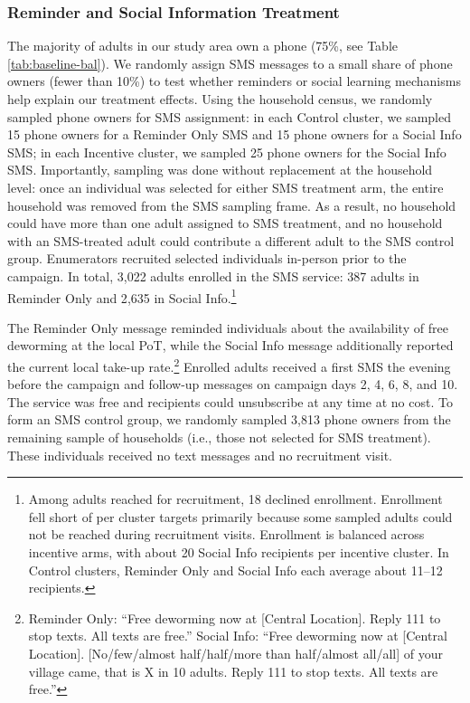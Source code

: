 \documentclass[12pt,a4paper]{article}
\begin{document}
\subsubsection{Reminder and Social Information Treatment}
The majority of adults in our study area own a phone (75\%, see Table
\ref{tab:baseline-bal}). We randomly assign SMS messages to a small share of phone owners (fewer than 10\%) to test whether reminders or social learning mechanisms help explain our treatment effects. Using the household census, we randomly sampled phone owners for SMS assignment: in each Control cluster, we sampled 15 phone owners for a Reminder Only SMS and 15 phone owners for a Social Info SMS; in each Incentive cluster, we sampled 25 phone owners for the Social Info SMS. Importantly, sampling was done without replacement at the household level: once an individual was selected for either SMS treatment arm, the entire household was removed from the SMS sampling frame. As a result, no household could have more than one adult assigned to SMS treatment, and no household with an SMS-treated adult could contribute a different adult to the SMS control group. Enumerators recruited selected individuals in-person prior to the campaign. In total, 3{,}022 adults enrolled in the SMS service: 387 adults in Reminder Only and 2{,}635 in Social Info.\footnote{Among adults reached for recruitment, 18 declined enrollment. Enrollment fell short of per cluster targets primarily because some sampled adults could not be reached during recruitment visits. Enrollment is balanced across incentive arms, with about 20 Social Info recipients per incentive cluster. In Control clusters, Reminder Only and Social Info each average about 11--12 recipients.}

The Reminder Only message reminded individuals about the availability of free deworming at the local PoT, while the Social Info message additionally reported the current local take-up rate.\footnote{Reminder Only: ``Free
deworming now at [Central Location]. Reply 111 to stop texts. All texts are free.'' Social Info: ``Free deworming now at [Central Location]. [No/few/almost half/half/more than half/almost all/all] of your village came, that is X in 10
adults. Reply 111 to stop texts. All texts are free.''} Enrolled adults received a first SMS the evening before the campaign and follow-up messages on campaign days 2, 4, 6, 8, and 10. The service was free and recipients could unsubscribe at any time at no cost. To form an SMS control group, we randomly sampled 3{,}813 phone owners from the remaining sample of households (i.e., those not selected for SMS treatment). These individuals received no text messages and no recruitment visit.%
\end{document}
